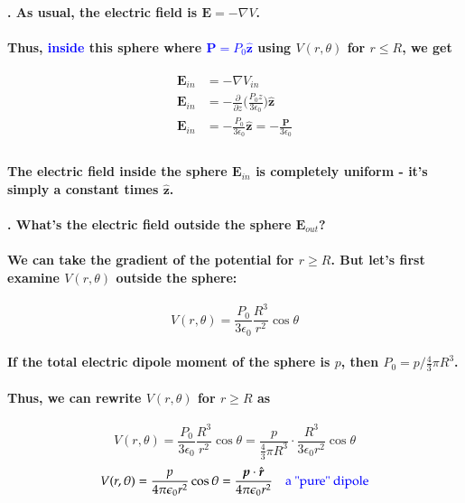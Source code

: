 \documentclass{article}
\begin{document}
\paragraph{. As usual, the electric field is $\boldsymbol{E}=-\nabla V$.}
\paragraph{Thus, \textcolor{blue}{inside} this sphere where \textcolor{blue}{$\boldsymbol{P}=P_0\hat{\boldsymbol{z}}$} using $V(r,\theta)$ for $r\leq R$, we get}
\begin{align*}
    \boldsymbol{E}_{in}&=-\nabla V_{in}\\
    \boldsymbol{E}_{in}&=-\frac{\partial}{\partial z}\bigg( \frac{P_0z}{3\epsilon_0}\bigg) \hat{\boldsymbol{z}}\\
    \boldsymbol{E}_{in}&=-\frac{P_0}{3\epsilon_0}\hat{\boldsymbol{z}}=-\frac{\boldsymbol{P}}{3\epsilon_0}\\
\end{align*}
\paragraph{The electric field inside the sphere $\boldsymbol{E}_{in}$ is completely uniform - it's simply a constant times $\hat{\boldsymbol{z}}$.}
\paragraph{. What's the electric field outside the sphere $\boldsymbol{E}_{out}$?}
\paragraph{We can take the gradient of the potential for $r\geq R$. But let's first examine $V(r,\theta)$ outside the sphere:}
\begin{equation*}
    V(r,\theta)=\frac{P_0}{3\epsilon_0}\frac{R^3}{r^2}\cos\theta
\end{equation*}
\paragraph{If the total electric dipole moment of the sphere is $p$, then $P_0=p/\frac{4}{3}\pi R^3$.}
\paragraph{Thus, we can rewrite $V(r,\theta)$ for $r\geq R$ as }
\begin{equation*}
    V(r,\theta)=\frac{P_0}{3\epsilon_0}\frac{R^3}{r^2}\cos\theta=\frac{p}{\frac{4}{3}\pi R^3}\cdot\frac{R^3}{3\epsilon_0r^2}\cos\theta
\end{equation*}
\begin{equation*}
    V(r,\theta)= \frac{p}{4\pi\epsilon_0r^2}\cos\theta=\frac{\boldsymbol{p}\cdot\hat{\boldsymbol{r}}}{4\pi \epsilon_0 r^2}\quad\text{\textcolor{blue}{a "pure" dipole}}
\end{equation*}
\end{document}
